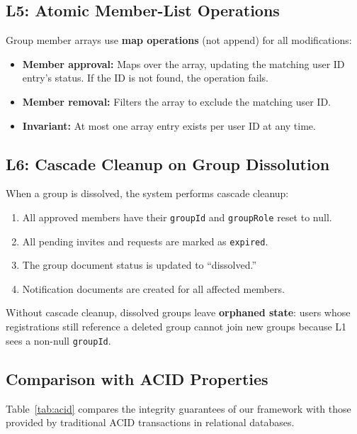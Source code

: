 \documentclass[11pt,a4paper]{article}
\theoremstyle{plain}
\theoremstyle{definition}
\theoremstyle{remark}
\begin{document}
\subsection{L5: Atomic Member-List Operations}

Group member arrays use \textbf{map operations} (not append) for all modifications:
\begin{itemize}[noitemsep,topsep=3pt]
    \item \textbf{Member approval:} Maps over the array, updating the matching user ID entry's status. If the ID is not found, the operation fails.
    \item \textbf{Member removal:} Filters the array to exclude the matching user ID.
    \item \textbf{Invariant:} At most one array entry exists per user ID at any time.
\end{itemize}

\subsection{L6: Cascade Cleanup on Group Dissolution}

When a group is dissolved, the system performs cascade cleanup:
\begin{enumerate}[noitemsep,topsep=3pt]
    \item All approved members have their \texttt{groupId} and \texttt{groupRole} reset to null.
    \item All pending invites and requests are marked as \texttt{expired}.
    \item The group document status is updated to ``dissolved.''
    \item Notification documents are created for all affected members.
\end{enumerate}

Without cascade cleanup, dissolved groups leave \textbf{orphaned state}: users whose registrations still reference a deleted group cannot join new groups because L1 sees a non-null \texttt{groupId}.

\subsection{Comparison with ACID Properties}

Table~\ref{tab:acid} compares the integrity guarantees of our framework with those provided by traditional ACID transactions in relational databases.
\end{document}
